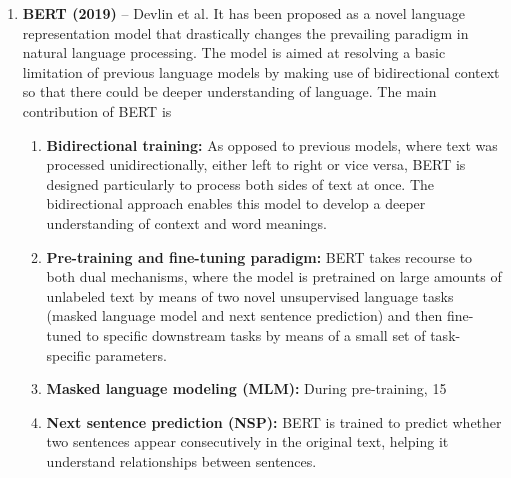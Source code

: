 \documentclass[conference]{IEEEtran}
\begin{document}
\begin{enumerate}
\item \textbf{BERT (2019)} – Devlin et al. \cite{devlin2019bert} It has been proposed as a novel language representation model that drastically changes the prevailing paradigm in natural language processing. The model is aimed at resolving a basic limitation of previous language models by making use of bidirectional context so that there could be deeper understanding of language. The main contribution of BERT is
\begin{enumerate}
\item \textbf{Bidirectional training:} As opposed to previous models, where text was processed unidirectionally, either left to right or vice versa, BERT is designed particularly to process both sides of text at once. The bidirectional approach enables this model to develop a deeper understanding of context and word meanings.
\item \textbf{Pre-training and fine-tuning paradigm:} BERT takes recourse to both dual mechanisms, where the model is pretrained on large amounts of unlabeled text by means of two novel unsupervised language tasks (masked language model and next sentence prediction) and then fine-tuned to specific downstream tasks by means of a small set of task-specific parameters.

\item \textbf{Masked language modeling (MLM):} During pre-training, 15%

\item \textbf{Next sentence prediction (NSP):} BERT is trained to predict whether two sentences appear consecutively in the original text, helping it understand relationships between sentences.


\end{enumerate}
\end{enumerate}
\end{document}

